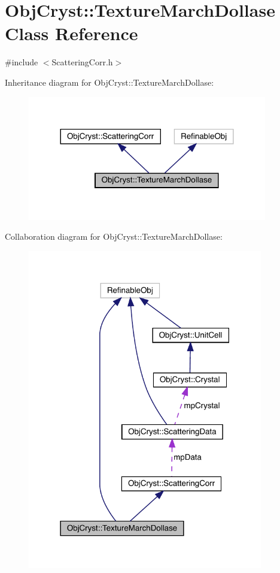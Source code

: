 \hypertarget{class_obj_cryst_1_1_texture_march_dollase}{}\section{Obj\+Cryst\+::Texture\+March\+Dollase Class Reference}
\label{class_obj_cryst_1_1_texture_march_dollase}


{\ttfamily \#include $<$Scattering\+Corr.\+h$>$}



Inheritance diagram for Obj\+Cryst\+::Texture\+March\+Dollase\+:
\nopagebreak
\begin{figure}[H]
\begin{center}
\leavevmode
\includegraphics[width=296pt]{class_obj_cryst_1_1_texture_march_dollase__inherit__graph}
\end{center}
\end{figure}


Collaboration diagram for Obj\+Cryst\+::Texture\+March\+Dollase\+:
\nopagebreak
\begin{figure}[H]
\begin{center}
\leavevmode
\includegraphics[width=291pt]{class_obj_cryst_1_1_texture_march_dollase__coll__graph}
\end{center}
\end{figure}
